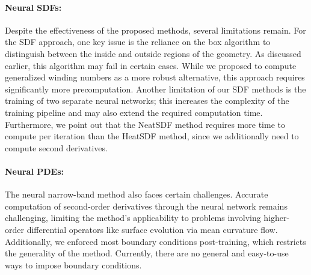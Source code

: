 \documentclass[draft,12pt,openany]{book}
\theoremstyle{plainnormal}
\theoremstyle{remark}
\begin{document}
\paragraph{Neural SDFs:} Despite the effectiveness of the proposed methods, several limitations remain. For the SDF approach, one key issue is the reliance on the box algorithm to distinguish between the inside and outside regions of the geometry. As discussed earlier, this algorithm may fail in certain cases. While we proposed to compute generalized winding numbers as a more robust alternative, this approach requires significantly more precomputation. Another limitation of our SDF methods is the training of two separate neural networks; this increases the complexity of the training pipeline and may also extend the required computation time. Furthermore, we point out that the NeatSDF method requires more time to compute per iteration than the HeatSDF method, since we additionally need to compute second derivatives.
\paragraph{Neural PDEs:} The neural narrow-band method also faces certain challenges. Accurate computation of second-order derivatives through the neural network remains challenging, limiting the method's applicability to problems involving higher-order differential operators like surface evolution via mean curvature flow. Additionally, we enforced most boundary conditions post-training, which restricts the generality of the method. Currently, there are no general and easy-to-use ways to impose boundary conditions. 
\end{document}

